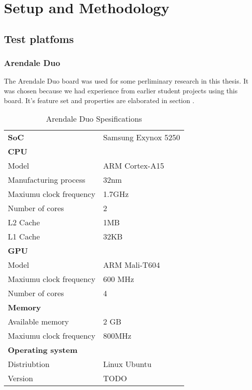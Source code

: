 \chapter[Setup and Methodology]{Setup and Methodology} \label{setupandmethodology}

\section{Test platfoms}

\subsection{Arendale Duo}
The Arendale Duo board was used for some perliminary research in this thesis.
It was chosen because we had experience from earlier student projects using this board.
It's feature set and properties are elaborated in section .
\begin{table}[h]
  \begin{tabular}{ll}
    \textbf{SoC}              & Samsung Exynox 5250 \\
    \textbf{CPU}              &  \\
    Model                     & ARM Cortex-A15 \\
    Manufacturing process     & 32nm \\
    Maxiumu clock frequency   & 1.7GHz \\
    Number of cores           & 2 \\
    L2 Cache                  & 1MB \\
    L1 Cache                  & 32KB \\
    \textbf{GPU}              &  \\
    Model                     & ARM Mali-T604 \\
    Maxiumu clock frequency   & 600 MHz \\
    Number of cores           & 4 \\
    \textbf{Memory}           &  \\
    Available memory          & 2 GB \\
    Maxiumu clock frequency   & 800MHz \\
    \textbf{Operating system} &  \\
    Distriubtion              & Linux Ubuntu \\
    Version                   & TODO
  \end{tabular}
  \caption{Arendale Duo Spesifications\label{overflow}}
\end{table}
